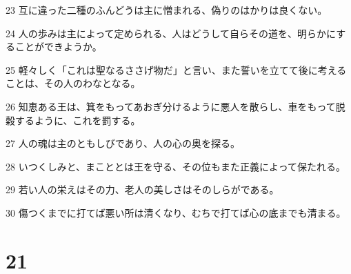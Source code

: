\par 23 互に違った二種のふんどうは主に憎まれる、偽りのはかりは良くない。
\par 24 人の歩みは主によって定められる、人はどうして自らその道を、明らかにすることができようか。
\par 25 軽々しく「これは聖なるささげ物だ」と言い、また誓いを立てて後に考えることは、その人のわなとなる。
\par 26 知恵ある王は、箕をもってあおぎ分けるように悪人を散らし、車をもって脱穀するように、これを罰する。
\par 27 人の魂は主のともしびであり、人の心の奥を探る。
\par 28 いつくしみと、まこととは王を守る、その位もまた正義によって保たれる。
\par 29 若い人の栄えはその力、老人の美しさはそのしらがである。
\par 30 傷つくまでに打てば悪い所は清くなり、むちで打てば心の底までも清まる。

\chapter{21}

